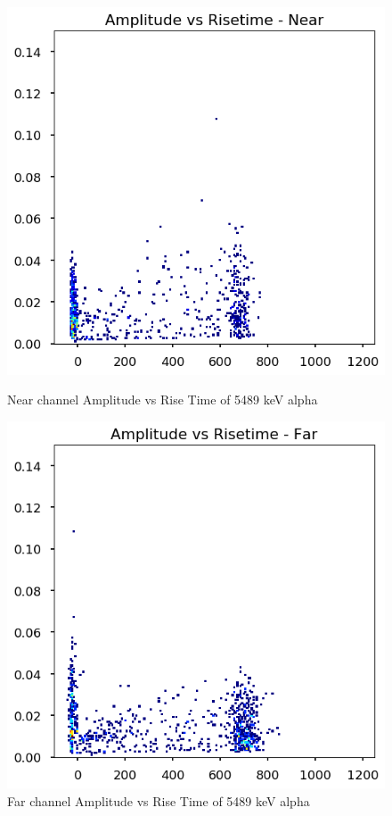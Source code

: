 \documentclass[a4paper]{article}
\begin{document}
\begin{figure}[H]
    \centering
    \begin{minipage}{.5\textwidth}
        \centering
        \includegraphics[width=1\linewidth]{Radon/steel_achinos-2d_South_alpha3.png}
        \caption{Near channel Amplitude vs Rise Time of 5489 keV alpha}
        \label{fig:prob1_6_2}
    \end{minipage}%
    \begin{minipage}{0.5\textwidth}
        \centering
        \includegraphics[width=1\linewidth]{Radon/steel_achinos-2d_North_alpha3.png}
        \caption{Far channel Amplitude vs Rise Time of 5489 keV alpha}
        \label{fig:prob1_6_1}
    \end{minipage}
\end{figure}
\end{document}
